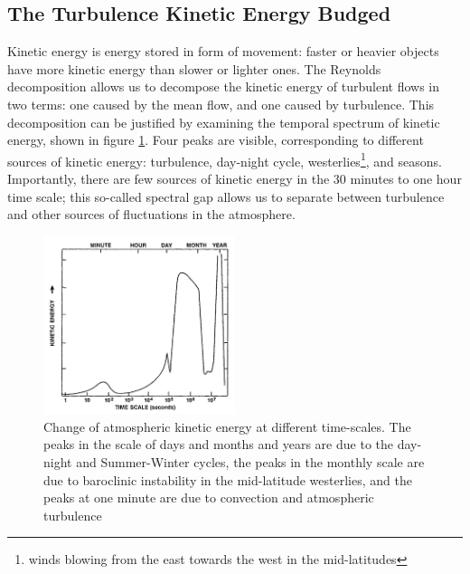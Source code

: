 \documentclass[12pt]{book}
\begin{document}
\subsection{The Turbulence Kinetic Energy Budged}
Kinetic energy is energy stored in form of movement: faster or heavier objects have more kinetic energy than slower or lighter ones. The Reynolds decomposition allows us to decompose the kinetic energy of turbulent flows in two terms: one caused by the mean flow, and one caused by turbulence. This decomposition can be justified by examining the temporal spectrum of kinetic energy, shown in figure \ref{fig:tkespectrum}. Four peaks are visible, corresponding to different sources of kinetic energy: turbulence, day-night cycle, westerlies\footnote{winds blowing from the east towards the west in the mid-latitudes}, and seasons. Importantly, there are few sources of kinetic energy in the 30 minutes to one hour time scale; this so-called spectral gap allows us to separate between turbulence and other sources of fluctuations in the atmosphere.

\begin{figure}
\caption{Change of atmospheric kinetic energy at different time-scales. The peaks in the scale of days and months and years are due to the day-night and Summer-Winter cycles, the peaks in the monthly scale are due to baroclinic instability in the mid-latitude westerlies, and the peaks at one minute are due to convection and atmospheric turbulence \cite{tkespectrumsrc,tkespectrumorig}}
\label{fig:tkespectrum}
\centering
\includegraphics[width=0.5\textwidth]{images/kinetic_energy_spectrum}
\end{figure}
\end{document}
